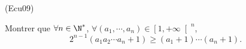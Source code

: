 \begin{tiny}(Ecu09)\end{tiny}
Montrer que $\forall n\in \N^{*}$, $\forall (a_{1},\cdots
,a_{n})\in \left[ 1,+\infty \right[ ^{n}$,
\[
2^{n-1}(a_{1}a_{2}\cdots a_{n}+1)\geq (a_{1}+1)\cdots (a_{n}+1).
\]